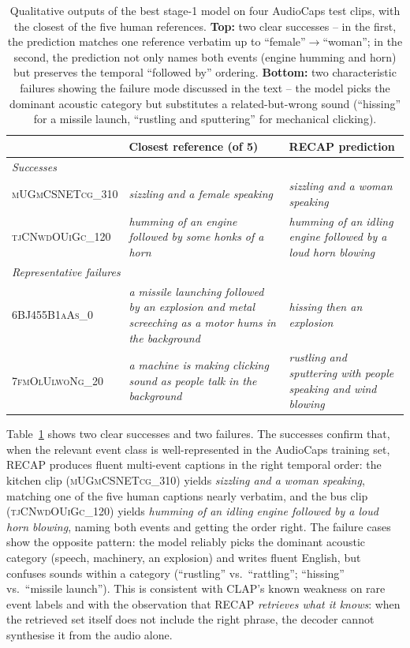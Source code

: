\documentclass[10pt,twocolumn,letterpaper]{article}
\begin{document}
\begin{table}[t]
\centering\small
\setlength{\tabcolsep}{6pt}
\begin{tabular}{l p{} p{}}
\toprule
& \textbf{Closest reference (of 5)} & \textbf{RECAP prediction} \\
\midrule
\multicolumn{3}{l}{\emph{Successes}} \\
\midrule
\textsc{mUGmCSNETcg\_310} &
\emph{sizzling and a female speaking} &
\emph{sizzling and a woman speaking} \\
\addlinespace
\textsc{tjCNwdOUiGc\_120} &
\emph{humming of an engine followed by some honks of a horn} &
\emph{humming of an idling engine followed by a loud horn blowing} \\
\midrule
\multicolumn{3}{l}{\emph{Representative failures}} \\
\midrule
\textsc{6BJ455B1aAs\_0} &
\emph{a missile launching followed by an explosion and metal screeching as a motor hums in the background} &
\emph{hissing then an explosion} \\
\addlinespace
\textsc{7fmOlUlwoNg\_20} &
\emph{a machine is making clicking sound as people talk in the background} &
\emph{rustling and sputtering with people speaking and wind blowing} \\
\bottomrule
\end{tabular}
\caption{Qualitative outputs of the best stage-1 model on four AudioCaps
test clips, with the closest of the five human references. \textbf{Top:} two
clear successes -- in the first, the prediction matches one reference
verbatim up to ``female''$\!\to\!$``woman''; in the second, the prediction not
only names both events (engine humming and horn) but preserves the temporal
``followed by'' ordering. \textbf{Bottom:} two characteristic failures showing
the failure mode discussed in the text -- the model picks the dominant
acoustic category but substitutes a related-but-wrong sound (``hissing'' for
a missile launch, ``rustling and sputtering'' for mechanical clicking).}
\label{tab:qual}
\end{table}

Table~\ref{tab:qual} shows two clear successes and two failures.
The successes confirm that, when the relevant event class is well-represented
in the AudioCaps training set, RECAP produces fluent multi-event captions in
the right temporal order: the kitchen clip (\textsc{mUGmCSNETcg\_310}) yields
\emph{sizzling and a woman speaking}, matching one of the five human captions
nearly verbatim, and the bus clip (\textsc{tjCNwdOUiGc\_120}) yields
\emph{humming of an idling engine followed by a loud horn blowing}, naming
both events and getting the order right. The failure cases show the
opposite pattern: the model reliably picks the dominant acoustic category
(speech, machinery, an explosion) and writes fluent English, but confuses
sounds within a category (``rustling'' vs.\ ``rattling''; ``hissing'' vs.\
``missile launch''). This is consistent with CLAP's known weakness on rare
event labels and with the observation that
RECAP \emph{retrieves what it knows}: when the retrieved set itself does not
include the right phrase, the decoder cannot synthesise it from the audio
alone.
\end{document}
